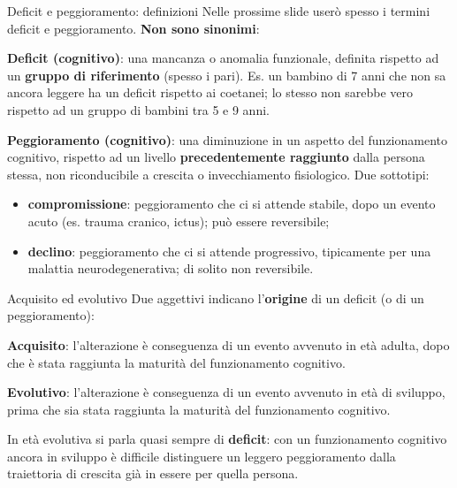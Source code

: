 \documentclass[
  ignorenonframetext,
  aspectratio=169,
]{beamer}
\providecommand{\tightlist}{%
  \setlength{\itemsep}{0pt}\setlength{\parskip}{0pt}}
\begin{document}
\begin{frame}{Deficit e peggioramento: definizioni}
\label{deficit-e-peggioramento-definizioni}
Nelle prossime slide userò spesso i termini deficit e peggioramento.
\textbf{Non sono sinonimi}:

\textbf{Deficit (cognitivo)}: una mancanza o anomalia funzionale,
definita rispetto ad un \textbf{gruppo di riferimento} (spesso i pari).
Es. un bambino di 7 anni che non sa ancora leggere ha un deficit
rispetto ai coetanei; lo stesso non sarebbe vero rispetto ad un gruppo
di bambini tra 5 e 9 anni.

\pause

\textbf{Peggioramento (cognitivo)}: una diminuzione in un aspetto del
funzionamento cognitivo, rispetto ad un livello \textbf{precedentemente
raggiunto} dalla persona stessa, non riconducibile a crescita o
invecchiamento fisiologico. Due sottotipi:

\begin{itemize}
\tightlist
\item
  \textbf{compromissione}: peggioramento che ci si attende stabile, dopo
  un evento acuto (es. trauma cranico, ictus); può essere reversibile;
\item
  \textbf{declino}: peggioramento che ci si attende progressivo,
  tipicamente per una malattia neurodegenerativa; di solito non
  reversibile.
\end{itemize}
\end{frame}

\begin{frame}{Acquisito ed evolutivo}
\label{acquisito-ed-evolutivo}
Due aggettivi indicano l'\textbf{origine} di un deficit (o di un
peggioramento):

\textbf{Acquisito}: l'alterazione è conseguenza di un evento avvenuto in
età adulta, dopo che è stata raggiunta la maturità del funzionamento
cognitivo.

\textbf{Evolutivo}: l'alterazione è conseguenza di un evento avvenuto in
età di sviluppo, prima che sia stata raggiunta la maturità del
funzionamento cognitivo.

\vspace{1em}

In età evolutiva si parla quasi sempre di \textbf{deficit}: con un
funzionamento cognitivo ancora in sviluppo è difficile distinguere un
leggero peggioramento dalla traiettoria di crescita già in essere per
quella persona.
\end{frame}
\end{document}

